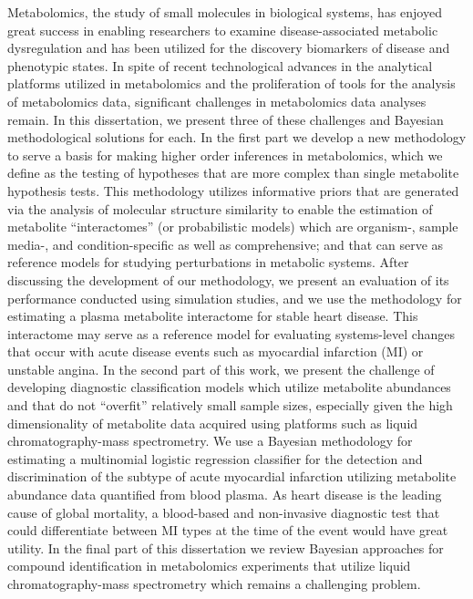 \documentclass[final]{ulthesis}
\begin{document}
\begin{dissertationabstract}
Metabolomics, the study of small molecules in biological systems, has enjoyed great success in enabling researchers to examine disease-associated metabolic dysregulation and has been utilized for the discovery biomarkers of disease and phenotypic states. In spite of recent technological advances in the analytical platforms utilized in metabolomics and the proliferation of tools for the analysis of metabolomics data, significant challenges in metabolomics data analyses remain. In this dissertation, we present three of these challenges and Bayesian methodological solutions for each. In the first part we develop a new methodology to serve a basis for making higher order inferences in metabolomics, which we define as the testing of hypotheses that are more complex than single metabolite hypothesis tests. This methodology utilizes informative priors that are generated via the analysis of molecular structure similarity to enable the estimation of metabolite “interactomes” (or probabilistic models) which are organism-, sample media-, and condition-specific as well as comprehensive; and that can serve as reference models for studying perturbations in metabolic systems. After discussing the development of our methodology, we present an evaluation of its performance conducted using simulation studies, and we use the methodology for estimating a plasma metabolite interactome for stable heart disease. This interactome may serve as a reference model for evaluating systems-level changes that occur with acute disease events such as myocardial infarction (MI) or unstable angina. In the second part of this work, we present the challenge of developing diagnostic classification models which utilize metabolite abundances and that do not “overfit” relatively small sample sizes, especially given the high dimensionality of metabolite data acquired using platforms such as liquid chromatography-mass spectrometry. We use a Bayesian methodology for estimating a multinomial logistic regression classifier for the detection and discrimination of the subtype of acute myocardial infarction utilizing metabolite abundance data quantified from blood plasma. As heart disease is the leading cause of global mortality, a blood-based and non-invasive diagnostic test that could differentiate between MI types at the time of the event would have great utility. In the final part of this dissertation we review Bayesian approaches for compound identification in metabolomics experiments that utilize liquid chromatography-mass spectrometry which remains a challenging problem.
\end{dissertationabstract}
\end{document}
